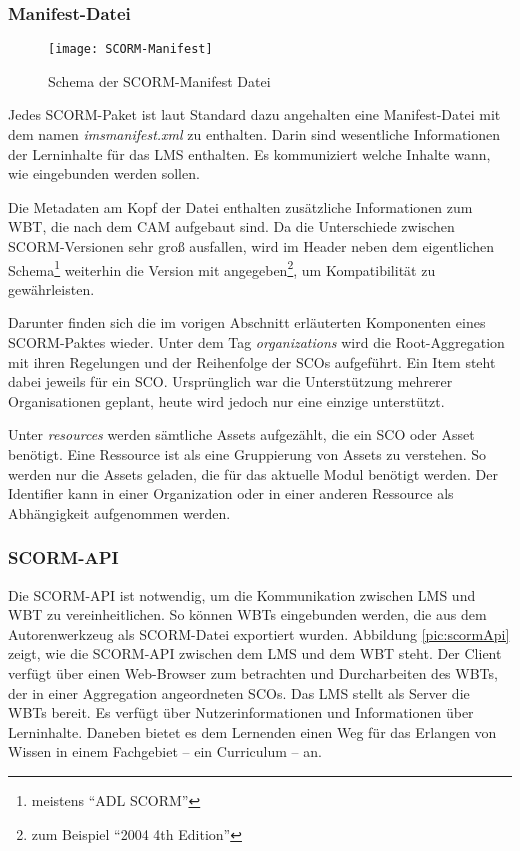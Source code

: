 \subsubsection{Manifest-Datei}
\begin{wrapfigure}{r}{0.5\textwidth}
\vspace{-15pt} 
\texttt{[image: SCORM-Manifest]}
\vspace{-20pt}
\caption{Schema der SCORM-Manifest Datei\footnotemark}\label{pic:scormManifest}
\vspace{-15pt} 
\end{wrapfigure}
Jedes SCORM-Paket ist laut Standard dazu angehalten eine Manifest-Datei mit dem
namen \textit{imsmanifest.xml} zu enthalten. Darin sind wesentliche
Informationen der Lerninhalte für das LMS enthalten. Es kommuniziert welche
Inhalte wann, wie eingebunden werden sollen.

Die Metadaten am Kopf der Datei enthalten zusätzliche Informationen zum WBT, die
nach dem \ac{CAM} aufgebaut sind. Da die Unterschiede zwischen
SCORM-Versionen sehr groß ausfallen, wird im Header neben dem
eigentlichen Schema\footnote{meistens "`ADL SCORM"'} weiterhin die Version
mit angegeben\footnote{zum Beispiel "`2004 4th Edition"'}, um Kompatibilität zu
gewährleisten. 

Darunter finden sich die im vorigen Abschnitt erläuterten Komponenten eines
SCORM-Paktes wieder. Unter dem Tag \textit{organizations} wird die
Root-Aggregation mit ihren Regelungen und der Reihenfolge der SCOs aufgeführt. Ein
Item steht dabei jeweils für ein SCO. Ursprünglich war die Unterstützung
mehrerer Organisationen geplant, heute wird jedoch nur eine einzige unterstützt.

Unter \textit{resources} werden sämtliche Assets aufgezählt, die ein SCO oder
Asset benötigt. Eine Ressource ist als eine Gruppierung von Assets zu
verstehen. So werden nur die Assets geladen, die für das aktuelle Modul
benötigt werden. Der Identifier kann in einer Organization oder in einer anderen
Ressource als Abhängigkeit aufgenommen werden.

\subsubsection{SCORM-API}
Die SCORM-API ist notwendig, um die Kommunikation zwischen LMS und WBT zu
vereinheitlichen. So können WBTs eingebunden werden, die aus dem Autorenwerkzeug
als SCORM-Datei exportiert wurden. Abbildung \ref{pic:scormApi} zeigt, wie die
SCORM-API zwischen dem LMS und dem WBT steht. Der Client verfügt über einen
Web-Browser zum betrachten und Durcharbeiten des WBTs, der in einer Aggregation
angeordneten SCOs. Das LMS stellt als Server die WBTs bereit. Es verfügt über
Nutzerinformationen und Informationen über Lerninhalte. Daneben bietet es dem
Lernenden einen Weg für das Erlangen von Wissen in einem Fachgebiet -- ein
Curriculum -- an.

